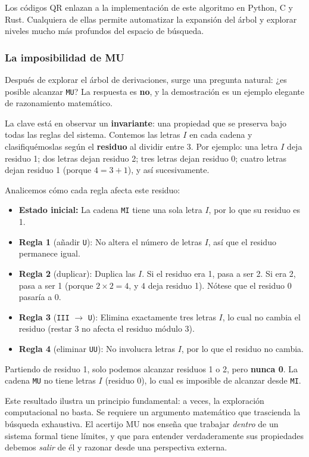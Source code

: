 Los códigos QR enlazan a la implementación de este algoritmo en Python, C y Rust. Cualquiera de ellas permite
automatizar la expansión del árbol y explorar niveles mucho más profundos del espacio de búsqueda.

\subsubsection{La imposibilidad de MU}

Después de explorar el árbol de derivaciones, surge una pregunta natural: ¿es posible alcanzar \texttt{MU}? La
respuesta es \textbf{no}, y la demostración es un ejemplo elegante de razonamiento matemático.

La clave está en observar un \textbf{invariante}: una propiedad que se preserva bajo todas las reglas del sistema.
Contemos las letras $I$ en cada cadena y clasifiquémoslas según el \textbf{residuo} al dividir entre 3. Por ejemplo:
una letra $I$ deja residuo 1; dos letras dejan residuo 2; tres letras dejan residuo 0; cuatro letras dejan residuo 1
(porque $4 = 3 + 1$), y así sucesivamente.

Analicemos cómo cada regla afecta este residuo:
\begin{itemize}
    \item \textbf{Estado inicial:} La cadena \texttt{MI} tiene una sola letra $I$, por lo que su residuo es 1.
    \item \textbf{Regla 1} (añadir \texttt{U}): No altera el número de letras $I$, así que el residuo permanece igual.
    \item \textbf{Regla 2} (duplicar): Duplica las $I$. Si el residuo era 1, pasa a ser 2. Si era 2, pasa a ser 1
          (porque $2 \times 2 = 4$, y $4$ deja residuo 1). Nótese que el residuo 0 pasaría a 0.
    \item \textbf{Regla 3} (\texttt{III} $\to$ \texttt{U}): Elimina exactamente tres letras $I$, lo cual no cambia el
          residuo (restar 3 no afecta el residuo módulo 3).
    \item \textbf{Regla 4} (eliminar \texttt{UU}): No involucra letras $I$, por lo que el residuo no cambia.
\end{itemize}

Partiendo de residuo 1, solo podemos alcanzar residuos 1 o 2, pero \textbf{nunca 0}. La cadena \texttt{MU} no tiene
letras $I$ (residuo 0), lo cual es imposible de alcanzar desde \texttt{MI}.

Este resultado ilustra un principio fundamental: a veces, la exploración computacional no basta. Se requiere un
argumento matemático que trascienda la búsqueda exhaustiva. El acertijo MU nos enseña que trabajar \emph{dentro} de un
sistema formal tiene límites, y que para entender verdaderamente sus propiedades debemos \emph{salir} de él y razonar
desde una perspectiva externa.

